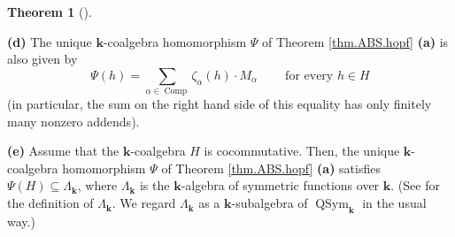 \documentclass
[numbers=enddot,12pt,final,onecolumn,notitlepage,abstracton]{scrartcl}%
\theoremstyle{definition}
\newtheorem{theo}{Theorem}[section]
\newenvironment{theorem}[1][]
{\begin{theo}[#1]\begin{leftbar}}
{\end{leftbar}\end{theo}}
\let\sumnonlimits\sum
\renewcommand{\sum}{\sumnonlimits\limits}
\begin{document}
\begin{theorem}
\textbf{(d)} The unique $\mathbf{k}$-coalgebra homomorphism $\Psi$ of Theorem
\ref{thm.ABS.hopf} \textbf{(a)} is also given by%
\[
\Psi\left(  h\right)  =\sum_{\alpha\in\operatorname*{Comp}}\zeta_{\alpha
}\left(  h\right)  \cdot M_{\alpha}\ \ \ \ \ \ \ \ \ \ \text{for every }h\in
H
\]
(in particular, the sum on the right hand side of this equality has only
finitely many nonzero addends).

\textbf{(e)} Assume that the $\mathbf{k}$-coalgebra $H$ is cocommutative.
Then, the unique $\mathbf{k}$-coalgebra homomorphism $\Psi$ of Theorem
\ref{thm.ABS.hopf} \textbf{(a)} satisfies $\Psi\left(  H\right)
\subseteq\Lambda_{\mathbf{k}}$, where $\Lambda_{\mathbf{k}}$ is the
$\mathbf{k}$-algebra of symmetric functions over $\mathbf{k}$. (See
\cite[\S 2]{Reiner} for the definition of $\Lambda_{\mathbf{k}}$. We regard
$\Lambda_{\mathbf{k}}$ as a $\mathbf{k}$-subalgebra of $\operatorname*{QSym}%
\nolimits_{\mathbf{k}}$ in the usual way.)
\end{theorem}
\end{document}
